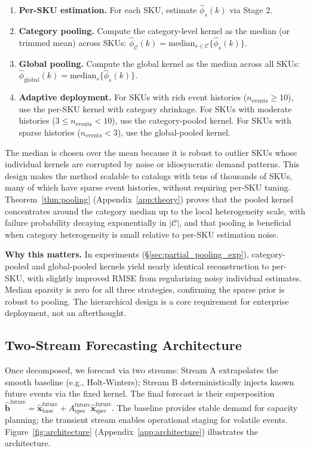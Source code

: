 \documentclass[10pt]{article} %
\theoremstyle{plain}
\theoremstyle{definition}
\newcommand{\Aspec}{A_{\text{spec}}}
\begin{document}
\begin{enumerate}
  \item \textbf{Per-SKU estimation.} For each SKU, estimate $\hat{\phi}_s(k)$ via Stage 2.
  \item \textbf{Category pooling.} Compute the category-level kernel as the median (or trimmed mean) across SKUs: $\hat{\phi}_{\mathcal{C}}(k) = \text{median}_{s \in \mathcal{C}} \{ \hat{\phi}_s(k) \}$.
  \item \textbf{Global pooling.} Compute the global kernel as the median across all SKUs: $\hat{\phi}_{\text{global}}(k) = \text{median}_{s} \{ \hat{\phi}_s(k) \}$.
  \item \textbf{Adaptive deployment.} For SKUs with rich event histories ($n_{\text{events}} \geq 10$), use the per-SKU kernel with category shrinkage. For SKUs with moderate histories ($3 \leq n_{\text{events}} < 10$), use the category-pooled kernel. For SKUs with sparse histories ($n_{\text{events}} < 3$), use the global-pooled kernel.
\end{enumerate}

The median is chosen over the mean because it is robust to outlier SKUs whose individual kernels are corrupted by noise or idiosyncratic demand patterns. This design makes the method scalable to catalogs with tens of thousands of SKUs, many of which have sparse event histories, without requiring per-SKU tuning. Theorem~\ref{thm:pooling} (Appendix~\ref{app:theory}) proves that the pooled kernel concentrates around the category median up to the local heterogeneity scale, with failure probability decaying exponentially in $|\mathcal{C}|$, and that pooling is beneficial when category heterogeneity is small relative to per-SKU estimation noise.

\textbf{Why this matters.} In experiments (\S\ref{sec:partial_pooling_exp}), category-pooled and global-pooled kernels yield nearly identical reconstruction to per-SKU, with slightly improved RMSE from regularizing noisy individual estimates. Median sparsity is zero for all three strategies, confirming the sparse prior is robust to pooling. The hierarchical design is a core requirement for enterprise deployment, not an afterthought.

\subsection{Two-Stream Forecasting Architecture}

Once decomposed, we forecast via two streams: Stream A extrapolates the smooth baseline (e.g., Holt-Winters); Stream B deterministically injects known future events via the fixed kernel. The final forecast is their superposition $\hat{\mathbf{b}}^{\text{future}} = \hat{\mathbf{x}}_{\text{base}}^{\text{future}} + \Aspec^{\text{future}} \hat{\mathbf{x}}_{\text{spec}}^{\text{future}}$. The baseline provides stable demand for capacity planning; the transient stream enables operational staging for volatile events. Figure~\ref{fig:architecture} (Appendix~\ref{app:architecture}) illustrates the architecture.
\end{document}
